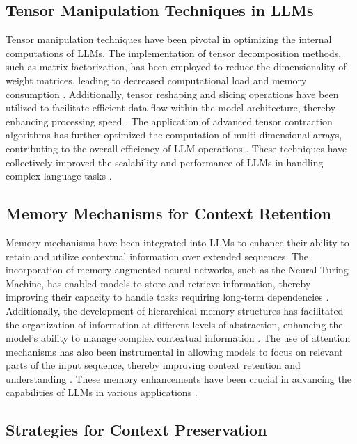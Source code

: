 \subsection{Tensor Manipulation Techniques in LLMs}

Tensor manipulation techniques have been pivotal in optimizing the internal computations of LLMs. The implementation of tensor decomposition methods, such as matrix factorization, has been employed to reduce the dimensionality of weight matrices, leading to decreased computational load and memory consumption \cite{penicig2024assessing}. Additionally, tensor reshaping and slicing operations have been utilized to facilitate efficient data flow within the model architecture, thereby enhancing processing speed \cite{monota2024optimizing}. The application of advanced tensor contraction algorithms has further optimized the computation of multi-dimensional arrays, contributing to the overall efficiency of LLM operations \cite{tarel2024transformative}. These techniques have collectively improved the scalability and performance of LLMs in handling complex language tasks \cite{whitmore2024assessing}.

\subsection{Memory Mechanisms for Context Retention}

Memory mechanisms have been integrated into LLMs to enhance their ability to retain and utilize contextual information over extended sequences. The incorporation of memory-augmented neural networks, such as the Neural Turing Machine, has enabled models to store and retrieve information, thereby improving their capacity to handle tasks requiring long-term dependencies \cite{roe2024semantic}. Additionally, the development of hierarchical memory structures has facilitated the organization of information at different levels of abstraction, enhancing the model's ability to manage complex contextual information \cite{chard2024auditing}. The use of attention mechanisms has also been instrumental in allowing models to focus on relevant parts of the input sequence, thereby improving context retention and understanding \cite{navjord2023beyond}. These memory enhancements have been crucial in advancing the capabilities of LLMs in various applications \cite{sulaiman2024evaluation, zakiev2024emergent}.

\subsection{Strategies for Context Preservation}

